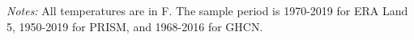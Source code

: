 \begin{landscape}
\begin{table}[htb]
\begin{threeparttable}
{\begin{tabular}{llcccccccccccccc}
\hline \hline
\end{tabular}
}
\begin{tablenotes}
\footnotesize \textit{Notes:} All temperatures are in \degree F. The sample period is 1970-2019 for ERA Land 5, 1950-2019 for PRISM, and 1968-2016 for GHCN.
\end{tablenotes}
\end{threeparttable}
\end{table}
\end{landscape}
\restoregeometry
